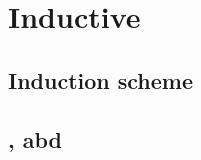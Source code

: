 \documentclass[thesis.tex]{subfiles}
\begin{document}
\chapter{Inductive}

\section{Induction scheme}
\section[iConstructor, iDestruct, iInductive]{,  abd }
\end{document}
